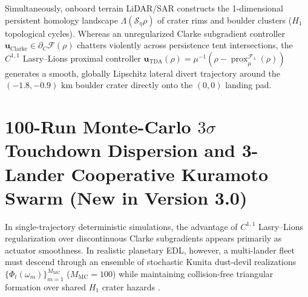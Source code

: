 \documentclass[11pt,a4paper,reqno]{article}
\theoremstyle{definition}
\theoremstyle{remark}
\begin{document}
Simultaneously, onboard terrain LiDAR/SAR constructs the 1-dimensional persistent homology landscape $\Lambda(\mathcal{S}_\eta\rho)$ of crater rims and boulder clusters ($H_1$ topological cycles). Whereas an unregularized Clarke subgradient controller $\mathbf{u}_{\mathrm{Clarke}} \in \partial_C\mathcal{F}(\rho)$ chatters violently across persistence tent intersections, the $C^{1,1}$ Lasry--Lions proximal controller $\mathbf{u}_{\mathrm{TDA}}(\rho) = \mu^{-1}(\rho - \operatorname{prox}_\mu^{\mathcal{F}_\lambda}(\rho))$ generates a smooth, globally Lipschitz lateral divert trajectory around the $(-1.8, -0.9)\text{ km}$ boulder crater directly onto the $(0,0)$ landing pad.

\section[100-Run Monte-Carlo 3-Sigma Touchdown Dispersion and 3-Lander Cooperative Kuramoto Swarm (New in Version 3.0)]{100-Run Monte-Carlo $3\sigma$ Touchdown Dispersion and 3-Lander Cooperative Kuramoto Swarm (New in Version 3.0)}

In single-trajectory deterministic simulations, the advantage of $C^{1,1}$ Lasry--Lions regularization over discontinuous Clarke subgradients appears primarily as actuator smoothness. In realistic planetary EDL, however, a multi-lander fleet must descend through an ensemble of stochastic Kunita dust-devil realizations $\{\Phi_t(\omega_m)\}_{m=1}^{M_{\mathrm{MC}}}$ ($M_{\mathrm{MC}} = 100$) while maintaining collision-free triangular formation over shared $H_1$ crater hazards \cite{ananda2026spde_v30, ananda2026automata_v70_monograph}.
\end{document}
